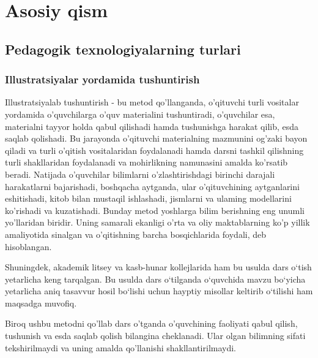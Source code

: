 \documentclass[epsf]{article}
\begin{document}
\section{Asosiy qism}
\subsection{Pedagogik texnologiyalarning turlari}
\subsubsection{Illustratsiyalar yordamida tushuntirish}
\hspace{0.4cm}
Illustratsiyalab tushuntirish - bu metod qo'llanganda, o'qituvchi turli
vositalar yordamida o'quvchilarga o'quv materialini tushuntiradi, o'quvchilar
esa, materialni tayyor holda qabul qilishadi hamda tushunishga harakat qilib,
esda saqlab qolishadi. Bu jarayonda o'qituvchi materialning mazmunini
og'zaki bayon qiladi va turli o'qitish vositalaridan foydalanadi hamda darsni
tashkil qilishning turli shakllaridan foydalanadi va mohirlikning namunasini
amalda ko'rsatib beradi. Natijada o'quvchilar bilimlarni o'zlashtirishdagi
birinchi darajali harakatlarni bajarishadi, boshqacha aytganda, ular
o'qituvchining aytganlarini eshitishadi, kitob bilan mustaqil ishlashadi,
jismlarni va ulaming modellarini ko'rishadi va kuzatishadi.
Bunday metod yoshlarga bilim berishning eng unumli yo'llaridan
biridir. Uning samarali ekanligi o'rta va oliy maktablarning ko'p yillik
amaliyotida sinalgan va o'qitishning barcha bosqichlarida foydali, deb
hisoblangan.

Shuningdek, akademik litsey va kasb-hunar kollejlarida ham bu usulda dars o`tish yetarlicha keng tarqalgan. Bu usulda dars o`tilganda o`quvchida mavzu bo`yicha yetarlicha aniq tasavvur hosil bo`lishi uchun hayptiy misollar keltirib o`tilishi ham maqsadga muvofiq. 

Biroq ushbu metodni qo'llab dars o'tganda o'quvchining
faoliyati qabul qilish, tushunish va esda saqlab qolish bilangina cheklanadi. Ular olgan bilimning sifati tekshirilmaydi va uning amalda qo'llanishi shakllantirilmaydi.
\end{document}
